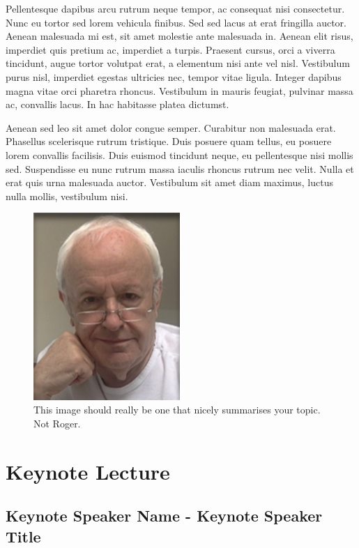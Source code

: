 \documentclass[12pt,]{book}
\begin{document}
Pellentesque dapibus arcu rutrum neque tempor, ac consequat nisi
consectetur. Nunc eu tortor sed lorem vehicula finibus. Sed sed lacus at
erat fringilla auctor. Aenean malesuada mi est, sit amet molestie ante
malesuada in. Aenean elit risus, imperdiet quis pretium ac, imperdiet a
turpis. Praesent cursus, orci a viverra tincidunt, augue tortor volutpat
erat, a elementum nisi ante vel nisl. Vestibulum purus nisl, imperdiet
egestas ultricies nec, tempor vitae ligula. Integer dapibus magna vitae
orci pharetra rhoncus. Vestibulum in mauris feugiat, pulvinar massa ac,
convallis lacus. In hac habitasse platea dictumst.

Aenean sed leo sit amet dolor congue semper. Curabitur non malesuada
erat. Phasellus scelerisque rutrum tristique. Duis posuere quam tellus,
eu posuere lorem convallis facilisis. Duis euismod tincidunt neque, eu
pellentesque nisi mollis sed. Suspendisse eu nunc rutrum massa iaculis
rhoncus rutrum nec velit. Nulla et erat quis urna malesuada auctor.
Vestibulum sit amet diam maximus, luctus nulla mollis, vestibulum nisi.

\begin{figure}
\includegraphics[width=2.19in]{assets/RPF-thumbnail} \caption{This image should really be one that nicely summarises your topic. Not Roger.}\label{fig:mainwg}
\end{figure}

\section*{Keynote Lecture}\label{keynote-lecture-5}

\subsection*{Keynote Speaker Name - Keynote Speaker
Title}\label{keynote-speaker-name---keynote-speaker-title-1}
\end{document}
